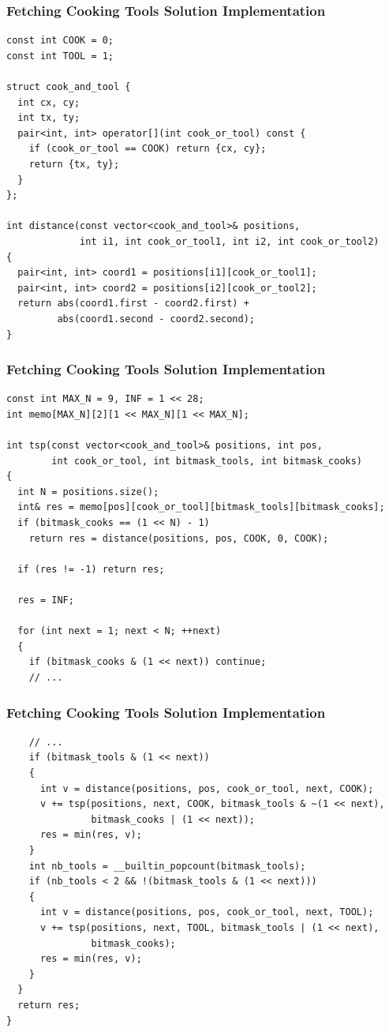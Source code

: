 \documentclass{beamer}
\begin{document}
\begin{frame}[containsverbatim]
\frametitle{Fetching Cooking Tools Solution Implementation}

\scriptsize
\begin{lstlisting}
const int COOK = 0;
const int TOOL = 1;

struct cook_and_tool {
  int cx, cy;
  int tx, ty;
  pair<int, int> operator[](int cook_or_tool) const {
    if (cook_or_tool == COOK) return {cx, cy};
    return {tx, ty};
  }
};

int distance(const vector<cook_and_tool>& positions,
             int i1, int cook_or_tool1, int i2, int cook_or_tool2)
{
  pair<int, int> coord1 = positions[i1][cook_or_tool1];
  pair<int, int> coord2 = positions[i2][cook_or_tool2];
  return abs(coord1.first - coord2.first) +
         abs(coord1.second - coord2.second);
}
\end{lstlisting}

\end{frame}

\begin{frame}[containsverbatim]
\frametitle{Fetching Cooking Tools Solution Implementation}

\scriptsize
\begin{lstlisting}
const int MAX_N = 9, INF = 1 << 28;
int memo[MAX_N][2][1 << MAX_N][1 << MAX_N];

int tsp(const vector<cook_and_tool>& positions, int pos,
        int cook_or_tool, int bitmask_tools, int bitmask_cooks)
{
  int N = positions.size();
  int& res = memo[pos][cook_or_tool][bitmask_tools][bitmask_cooks];
  if (bitmask_cooks == (1 << N) - 1)
    return res = distance(positions, pos, COOK, 0, COOK);

  if (res != -1) return res;

  res = INF;

  for (int next = 1; next < N; ++next)
  {
    if (bitmask_cooks & (1 << next)) continue;
    // ...
\end{lstlisting}

\end{frame}

\begin{frame}[containsverbatim]
\frametitle{Fetching Cooking Tools Solution Implementation}

\scriptsize
\begin{lstlisting}
    // ...
    if (bitmask_tools & (1 << next))
    {
      int v = distance(positions, pos, cook_or_tool, next, COOK);
      v += tsp(positions, next, COOK, bitmask_tools & ~(1 << next),
               bitmask_cooks | (1 << next));
      res = min(res, v);
    }
    int nb_tools = __builtin_popcount(bitmask_tools);
    if (nb_tools < 2 && !(bitmask_tools & (1 << next)))
    {
      int v = distance(positions, pos, cook_or_tool, next, TOOL);
      v += tsp(positions, next, TOOL, bitmask_tools | (1 << next),
               bitmask_cooks);
      res = min(res, v);
    }
  }
  return res;
}
\end{lstlisting}

\end{frame}
\end{document}
